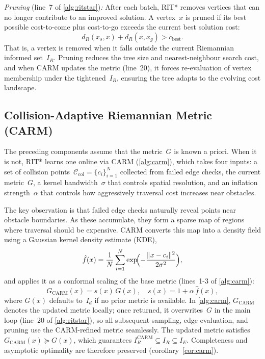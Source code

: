 \documentclass[journal]{IEEEtran}
\newcommand{\IR}{I_{\!R}}
\newcommand{\IE}{I_{\!E}}
\newcommand{\dR}{d_{\!R}}
\begin{document}
\textit{Pruning} (line~7 of \cref{alg:ritstar})\textit{:}
After each batch, RIT* removes vertices that can no longer
contribute to an improved solution. A vertex~$x$ is pruned if
its best possible cost-to-come plus cost-to-go exceeds the
current best solution cost:
\begin{equation}\label{eq:prune}
  \dR(x_s, x) + \dR(x, x_g) > c_{\mathrm{best}}.
\end{equation}
That is, a vertex is removed when it falls outside the
current Riemannian informed set~$\IR$. Pruning reduces the
tree size and nearest-neighbour search cost, and when CARM
updates the metric (line~20), it forces re-evaluation of
vertex membership under the tightened~$\IR$, ensuring the
tree adapts to the evolving cost landscape.

\subsection{Collision-Adaptive Riemannian Metric (CARM)}\label{sec:carm}

The preceding components assume that the metric~$G$ is known a priori.
When it is not, RIT* learns one online via CARM
(\cref{alg:carm}), which takes four inputs: a set of collision
points~$\mathcal{C}_{\mathrm{col}} = \{c_i\}_{i=1}^{N}$
collected from failed edge checks, the current
metric~$G$, a kernel bandwidth~$\sigma$ that controls
spatial resolution, and an inflation strength~$\alpha$ that
controls how aggressively traversal cost increases near
obstacles.

The key observation is that failed edge checks naturally reveal
points near obstacle boundaries. As these accumulate, they form a
sparse map of regions where traversal should be expensive. CARM
converts this map into a density field using a Gaussian kernel
density estimate (KDE),
\begin{equation}\label{eq:kde}
  \hat{f}(x) = \frac{1}{N}\sum_{i=1}^{N}
  \exp\!\Bigl(-\frac{\|x-c_i\|^2}{2\sigma^2}\Bigr),
\end{equation}
and applies it as a conformal scaling of the base metric
(lines~1-3 of \cref{alg:carm}):
\begin{equation}\label{eq:carm}
  G_{\mathrm{CARM}}(x) = s(x)\, G(x), \quad
  s(x) = 1 + \alpha\, \hat{f}(x),
\end{equation}
where $G(x)$ defaults to~$I_d$ if no prior metric is available.
In \cref{alg:carm}, $G_{\mathrm{CARM}}$ denotes the updated
metric locally; once returned, it overwrites~$G$ in the main
loop (line~20 of \cref{alg:ritstar}), so all subsequent
sampling, edge evaluation, and pruning use the CARM-refined
metric seamlessly. The updated metric satisfies
$G_{\mathrm{CARM}}(x) \succeq G(x)$, which guarantees
$\IR^{\mathrm{CARM}} \subseteq \IR \subseteq \IE$. Completeness
and asymptotic optimality are therefore preserved
(corollary~\ref{cor:carm}).
\end{document}
